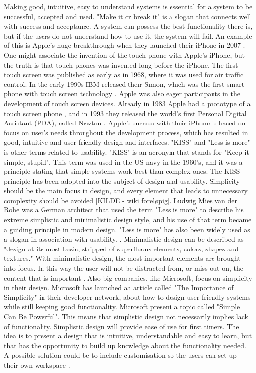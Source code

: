 Making good, intuitive, easy to understand systems is essential for a system to be successful, accepted and used. "Make it or break it" is a slogan that connects well with success and acceptance. A system can possess the best functionality there is, but if the users do not understand how to use it, the system will fail. An example of this is Apple's huge breakthrough when they launched their iPhone in 2007 \cite{iphone2007}. One might associate the invention of the touch phone with Apple's iPhone, but the truth is that touch phones was invented long before the iPhone. The first touch screen was published as early as in 1968, where it was used for air traffic control. In the early 1990s IBM released their Simon, which was the first smart phone with touch screen technology \cite{touchphone}. Apple was also eager participants in the development of touch screen devices. Already in 1983 Apple had a prototype of a touch screen phone \cite{applefirst1983}, and in 1993 they released the world's first Personal Digital Assistant (PDA), called Newton \cite{touchphone}. Apple’s success with their iPhone is based on focus on user’s needs throughout the development process, which has resulted in good, intuitive and user-friendly design and interfaces. "KISS" and "Less is more" is other terms related to usability. "KISS" is an acronym that stands for "Keep it simple, stupid". This term was used in the US navy in the 1960's, and it was a principle stating that simple systems work best than complex ones. The KISS principle has been adopted into the subject of design and usability. Simplicity should be the main focus in design, and every element that leads to unnecessary complexity should be avoided [KILDE - wiki foreløpig]. Ludwig Mies van der Rohe was a German architect that used the term "Less is more" to describe his extreme simplistic and minimalistic design style, and his use of that term became a guiding principle in modern design. "Less is more" has also been widely used as a slogan in association with usability. \cite{rohe}. Minimalistic design can be described as "design at its most basic, stripped of superfluous elements, colors, shapes and textures." With minimalistic design, the most important elements are brought into focus. In this way the user will not be distracted from, or miss out on, the content that is important \cite{lessismore}. Also big companies, like Microsoft, focus on simplicity in their design. Microsoft has launched an article called "The Importance of Simplicity" in their developer network, about how to design user-friendly systems while still keeping good functionality. Microsoft present a topic called "Simple Can Be Powerful". This means that simplistic design not necessarily implies lack of functionality. Simplistic design will provide ease of use for first timers. The idea is to present a design that is intuitive, understandable and easy to learn, but that has the opportunity to build up knowledge about the functionality needed. A possible solution could be to include customisation so the users can set up their own workspace \cite{msdnsimple}.             

